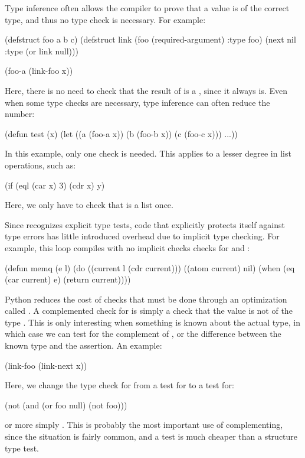 {Type inference often allows the compiler to prove that a value is of the
correct type, and thus no type check is necessary.  For example:
\begin{lisp}
(defstruct foo a b c)
(defstruct link
  (foo (required-argument) :type foo)
  (next nil :type (or link null)))

(foo-a (link-foo x))
\end{lisp}
Here, there is no need to check that the result of  is a ,
since it always is.  Even when some type checks are necessary, type inference
can often reduce the number:
\begin{example}
(defun test (x)
  (let ((a (foo-a x))
        (b (foo-b x))
        (c (foo-c x)))
    ...))
\end{example}
In this example, only one  check is needed.  This applies to a
lesser degree in list operations, such as:
\begin{lisp}
(if (eql (car x) 3) (cdr x) y)
\end{lisp}
Here, we only have to check that  is a list once.

Since \python{} recognizes explicit type tests, code that explicitly protects
itself against type errors has little introduced overhead due to implicit type
checking.  For example, this loop compiles with no implicit checks checks for
 and :
\begin{lisp}
(defun memq (e l)
  (do ((current l (cdr current)))
      ((atom current) nil)
    (when (eq (car current) e) (return current))))
\end{lisp}

Python reduces the cost of checks that must be done through an optimization
called .  A complemented check for  is simply a check
that the value is not of the type .  This is only
interesting when something is known about the actual type, in which case we can
test for the complement of , or the
difference between the known type and the assertion.  An example:
\begin{lisp}
(link-foo (link-next x))
\end{lisp}
Here, we change the type check for  from a test for  to a
test for:
\begin{lisp}
(not (and (or foo null) (not foo)))
\end{lisp}
or more simply .  This is probably the most important use of
complementing, since the situation is fairly common, and a  test is
much cheaper than a structure type test.

}
